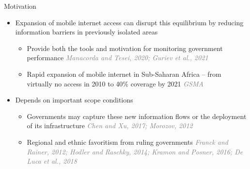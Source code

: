 \documentclass[10pt]{beamer}
\begin{document}
\begin{frame}{Motivation}
    \begin{itemize}\setlength\itemsep{1em}
        \vspace{0.5em}
        \item Expansion of mobile
        internet access can disrupt this equilibrium by reducing information barriers in previously
        isolated areas \vfill  \pause
        \begin{itemize}
        \item Provide both the tools and motivation for monitoring government
            performance \textcolor{gray}{\textit{Manacorda and Tesei, 2020; Guriev et al., 2021}} \vfill  \pause
            \item Rapid expansion of mobile internet in Sub-Saharan Africa – from virtually no access in 2010 to 40\% coverage by 2021 \textcolor{gray}{\textit{GSMA}} \vfill  \pause
        \end{itemize}
            \item Depends on important scope conditions \vfill  \pause
            \begin{itemize}
            \item Governments may capture these new information flows or the deployment of its infrastructure \textcolor{gray}{\textit{Chen and Xu, 2017; Morozov, 2012}} \vfill  \pause
            \item Regional and ethnic favoritism from ruling governments \textcolor{gray}{\textit{Franck and Rainer, 2012;
              Hodler and Raschky, 2014; Kramon and Posner, 2016; De Luca et al., 2018}} \vfill
            \end{itemize}
    \end{itemize}
\end{frame}
\end{document}
